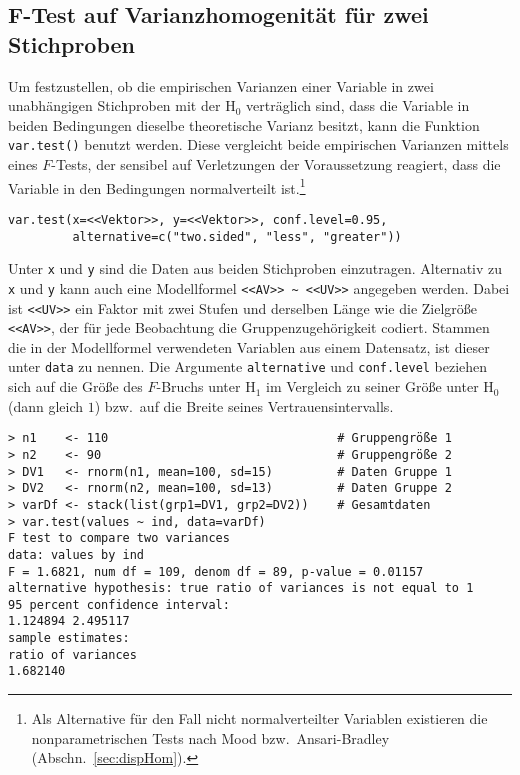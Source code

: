 \subsection[\texorpdfstring{$F$}{F}-Test auf Varianzhomogenität für zwei Stichproben]{$\bm{F}$-Test auf Varianzhomogenität für zwei Stichproben}

Um festzustellen, ob die empirischen Varianzen einer Variable in zwei unabhängigen Stichproben mit der $\text{H}_{0}$ verträglich sind, dass die Variable in beiden Bedingungen dieselbe theoretische Varianz besitzt, kann die Funktion \lstinline!var.test()! benutzt werden. Diese vergleicht beide empirischen Varianzen mittels eines $F$-Tests, der sensibel auf Verletzungen der Voraussetzung reagiert, dass die Variable in den Bedingungen normalverteilt ist.\footnote{Als Alternative für den Fall nicht normalverteilter Variablen existieren die nonparametrischen Tests nach Mood bzw.\ Ansari-Bradley (Abschn.\ \ref{sec:dispHom}).}
\begin{lstlisting}
var.test(x=<<Vektor>>, y=<<Vektor>>, conf.level=0.95,
         alternative=c("two.sided", "less", "greater"))
\end{lstlisting}

Unter \lstinline!x! und \lstinline!y! sind die Daten aus beiden Stichproben einzutragen. Alternativ zu \lstinline!x! und \lstinline!y! kann auch eine Modellformel \lstinline!<<AV>> ~ <<UV>>! angegeben werden. Dabei ist \lstinline!<<UV>>! ein Faktor mit zwei Stufen und derselben Länge wie die Zielgröße \lstinline!<<AV>>!, der für jede Beobachtung die Gruppenzugehörigkeit codiert. Stammen die in der Modellformel verwendeten Variablen aus einem Datensatz, ist dieser unter \lstinline!data! zu nennen. Die Argumente \lstinline!alternative! und \lstinline!conf.level! beziehen sich auf die Größe des $F$-Bruchs unter $\text{H}_{1}$ im Vergleich zu seiner Größe unter $\text{H}_{0}$ (dann gleich $1$) bzw.\ auf die Breite seines Vertrauensintervalls.
\begin{lstlisting}
> n1    <- 110                                # Gruppengröße 1
> n2    <- 90                                 # Gruppengröße 2
> DV1   <- rnorm(n1, mean=100, sd=15)         # Daten Gruppe 1
> DV2   <- rnorm(n2, mean=100, sd=13)         # Daten Gruppe 2
> varDf <- stack(list(grp1=DV1, grp2=DV2))    # Gesamtdaten
> var.test(values ~ ind, data=varDf)
F test to compare two variances
data: values by ind
F = 1.6821, num df = 109, denom df = 89, p-value = 0.01157
alternative hypothesis: true ratio of variances is not equal to 1
95 percent confidence interval:
1.124894 2.495117
sample estimates:
ratio of variances
1.682140
\end{lstlisting}

